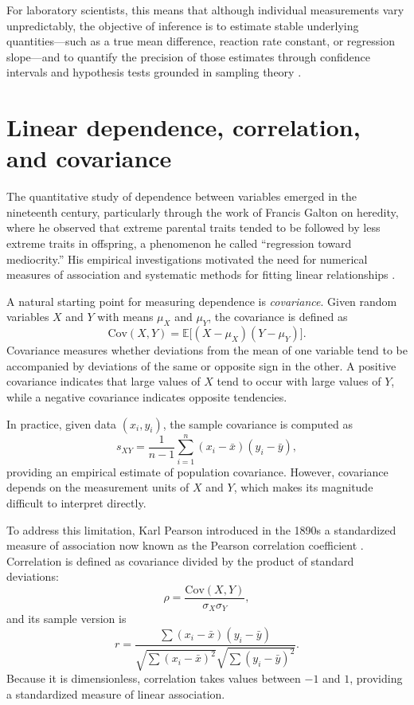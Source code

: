 For laboratory scientists, this means that although individual measurements vary unpredictably, the objective of inference is to estimate stable underlying quantities—such as a true mean difference, reaction rate constant, or regression slope—and to quantify the precision of those estimates through confidence intervals and hypothesis tests grounded in sampling theory \cite{cox_2006_principles}. 

\section{Linear dependence, correlation, and covariance}

The quantitative study of dependence between variables emerged in the nineteenth century, particularly through the work of Francis Galton on heredity, where he observed that extreme parental traits tended to be followed by less extreme traits in offspring, a phenomenon he called ``regression toward mediocrity.'' His empirical investigations motivated the need for numerical measures of association and systematic methods for fitting linear relationships \cite{galton_1886_regression}.

\medskip

A natural starting point for measuring dependence is \emph{covariance}. Given random variables \(X\) and \(Y\) with means \(\mu_X\) and \(\mu_Y\), the covariance is defined as
\[
    \mathrm{Cov}(X,Y) = \mathbb{E}\big[(X-\mu_X)(Y-\mu_Y)\big].
\]
Covariance measures whether deviations from the mean of one variable tend to be accompanied by deviations of the same or opposite sign in the other. A positive covariance indicates that large values of \(X\) tend to occur with large values of \(Y\), while a negative covariance indicates opposite tendencies.

\medskip

In practice, given data \((x_i,y_i)\), the sample covariance is computed as
\[
    s_{XY} = \frac{1}{n-1}\sum_{i=1}^n (x_i-\bar{x})(y_i-\bar{y}),
\]
providing an empirical estimate of population covariance. However, covariance depends on the measurement units of \(X\) and \(Y\), which makes its magnitude difficult to interpret directly.

\medskip

To address this limitation, Karl Pearson introduced in the 1890s a standardized measure of association now known as the Pearson correlation coefficient \cite{pearson_1895_contributions}. Correlation is defined as covariance divided by the product of standard deviations:
\[
    \rho = \frac{\mathrm{Cov}(X,Y)}{\sigma_X \sigma_Y},
\]
and its sample version is
\[
    r=\frac{\sum (x_i-\bar{x})(y_i-\bar{y})}
    {\sqrt{\sum (x_i-\bar{x})^2}\sqrt{\sum (y_i-\bar{y})^2}}.
\]
Because it is dimensionless, correlation takes values between \(-1\) and \(1\), providing a standardized measure of linear association.

